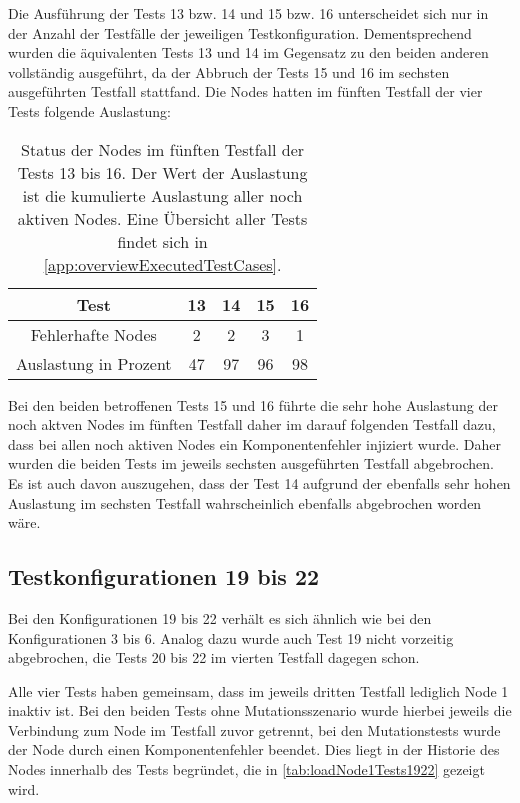 Die Ausführung der Tests 13 bzw. 14 und 15 bzw. 16 unterscheidet sich nur in der Anzahl der Testfälle der jeweiligen Testkonfiguration.
Dementsprechend wurden die äquivalenten Tests 13 und 14 im Gegensatz zu den beiden anderen vollständig ausgeführt, da der Abbruch der Tests 15 und 16 im sechsten ausgeführten Testfall stattfand.
Die Nodes hatten im fünften Testfall der vier Tests folgende Auslastung:

\begin{table}[h]
    \begin{tabular}{c|cccc}
    	        Test          & 13 & 14 & 15 & 16 \\ \hline
    	  Fehlerhafte Nodes   & 2  & 2  & 3  & 1  \\
    	Auslastung in Prozent & 47 & 97 & 96 & 98
    \end{tabular}
    \caption[Status der Nodes im fünften Testfall der Tests 13 bis 16]
    {Status der Nodes im fünften Testfall der Tests 13 bis 16.
    Der Wert der Auslastung ist die kumulierte Auslastung aller noch aktiven Nodes.
    Eine Übersicht aller Tests findet sich in \cref{app:overviewExecutedTestCases}.}
    \label{tab:loadTests1316}
\end{table}

Bei den beiden betroffenen Tests 15 und 16 führte die sehr hohe Auslastung der noch aktven Nodes im fünften Testfall daher im darauf folgenden Testfall dazu, dass bei allen noch aktiven Nodes ein Komponentenfehler injiziert wurde.
Daher wurden die beiden Tests im jeweils sechsten ausgeführten Testfall abgebrochen.
Es ist auch davon auszugehen, dass der Test 14 aufgrund der ebenfalls sehr hohen Auslastung im sechsten Testfall wahrscheinlich ebenfalls abgebrochen worden wäre.

\subsection{Testkonfigurationen 19 bis 22}
\label{subsec:noReconf1922}

Bei den Konfigurationen 19 bis 22 verhält es sich ähnlich wie bei den Konfigurationen 3 bis 6.
Analog dazu wurde auch Test 19 nicht vorzeitig abgebrochen, die Tests 20 bis 22 im vierten Testfall dagegen schon.

Alle vier Tests haben gemeinsam, dass im jeweils dritten Testfall lediglich Node 1 inaktiv ist.
Bei den beiden Tests ohne Mutationsszenario wurde hierbei jeweils die Verbindung zum Node im Testfall zuvor getrennt, bei den Mutationstests wurde der Node durch einen Komponentenfehler beendet.
Dies liegt in der Historie des Nodes innerhalb des Tests begründet, die in \cref{tab:loadNode1Tests1922} gezeigt wird.

